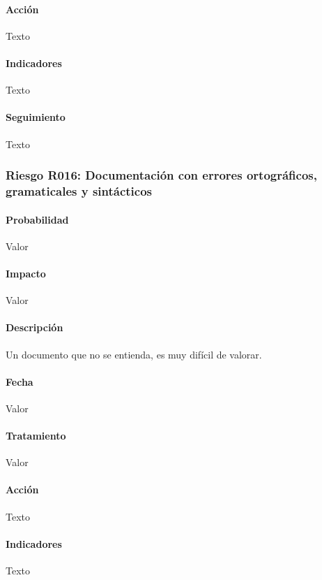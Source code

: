 \documentclass[10pt,a4paper]{article}
\begin{document}
				\paragraph{Acción} Texto %
				\paragraph{Indicadores} Texto %
				\paragraph{Seguimiento}	Texto %
				\subsubsection{Riesgo R016: Documentación con errores ortográficos, gramaticales y sintácticos}
				\paragraph{Probabilidad} Valor
				\paragraph{Impacto}	Valor
				\paragraph{Descripción} Un documento que no se entienda, es muy difícil de valorar.

				\paragraph{Fecha} Valor %
				\paragraph{Tratamiento} Valor %
				\paragraph{Acción} Texto %
				\paragraph{Indicadores} Texto %
\end{document}
